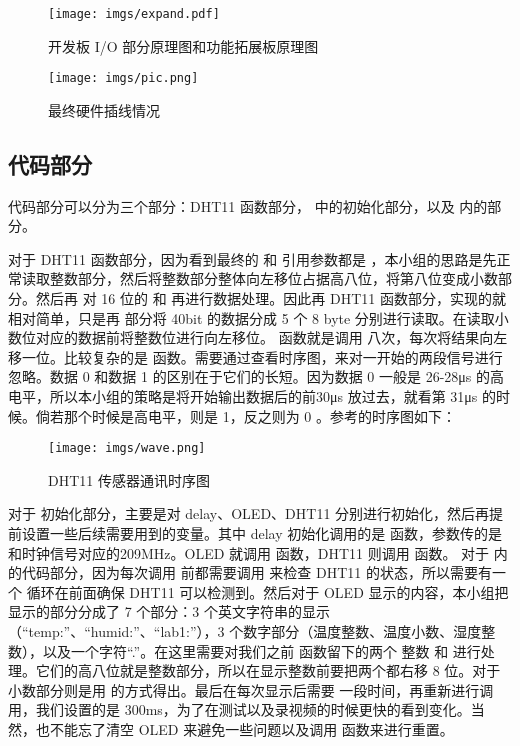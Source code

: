\newpage

\begin{figure}[h!]
    \centering
    \texttt{[image: imgs/expand.pdf]}
    \caption{开发板 I/O 部分原理图和功能拓展板原理图}
    \label{fig:io}
\end{figure}

\begin{figure}[h!]
    \centering
    \texttt{[image: imgs/pic.png]}
    \caption{最终硬件插线情况}
\end{figure}

\newpage

\subsection{代码部分}

代码部分可以分为三个部分：DHT11 函数部分， 中的初始化部分，以及  内的部分。

对于 DHT11 函数部分，因为看到最终的  和  引用参数都是 ，本小组的思路是先正常读取整数部分，然后将整数部分整体向左移位占据高八位，将第八位变成小数部分。然后再  对 16 位的  和  再进行数据处理。因此再 DHT11 函数部分，实现的就相对简单，只是再  部分将 40bit 的数据分成 5 个 8 byte 分别进行读取。在读取小数位对应的数据前将整数位进行向左移位。 函数就是调用  八次，每次将结果向左移一位。比较复杂的是  函数。需要通过查看时序图，来对一开始的两段信号进行忽略。数据 0 和数据 1 的区别在于它们的长短。因为数据 0 一般是 26-28\si{\micro\second} 的高电平，所以本小组的策略是将开始输出数据后的前30\si{\micro\second} 放过去，就看第 31\si{\micro\second} 的时候。倘若那个时候是高电平，则是 1，反之则为 0 。参考的时序图如下：

\begin{figure}[h!]
    \centering
    \texttt{[image: imgs/wave.png]}
    \caption{DHT11 传感器通讯时序图}
\end{figure}

对于  初始化部分，主要是对 delay、OLED、DHT11 分别进行初始化，然后再提前设置一些后续需要用到的变量。其中 delay 初始化调用的是  函数，参数传的是和时钟信号对应的209MHz。OLED 就调用  函数，DHT11 则调用  函数。
对于  内的代码部分，因为每次调用  前都需要调用  来检查 DHT11 的状态，所以需要有一个  循环在前面确保 DHT11 可以检测到。然后对于 OLED 显示的内容，本小组把显示的部分分成了 7 个部分：3 个英文字符串的显示（“temp:”、“humid:”、“lab1:”），3 个数字部分（温度整数、温度小数、湿度整数），以及一个字符“.”。在这里需要对我们之前  函数留下的两个  整数  和  进行处理。它们的高八位就是整数部分，所以在显示整数前要把两个都右移 8 位。对于小数部分则是用  的方式得出。最后在每次显示后需要  一段时间，再重新进行调用，我们设置的是 300ms，为了在测试以及录视频的时候更快的看到变化。当然，也不能忘了清空 OLED 来避免一些问题以及调用  函数来进行重置。

